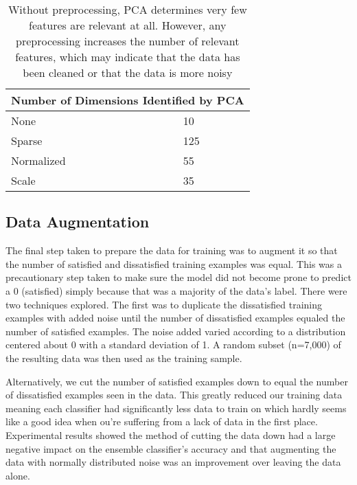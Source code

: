 \documentclass[11pt]{article}
\begin{document}
\begin{table}[h]
    \captionsetup{width=0.8\textwidth}
    \centering
    \begin{tabular}{ |p{2cm}||p{1cm}| }
    \hline
        \multicolumn{2}{|c|}{Number of Dimensions Identified by PCA} \\
    \hline
        None        & 10   \\
        Sparse      & 125  \\
        Normalized  & 55   \\
        Scale       & 35   \\
    \hline
    \end{tabular}
    \caption{Without preprocessing, PCA determines very few features are 
        relevant at all. However, any preprocessing increases the number of 
        relevant features, which may indicate that the data has been cleaned 
        or that the data is more noisy}
    \label{table:PCA}
\end{table}

\subsection{Data Augmentation} \label{data_aug}
The final step taken to prepare the data for training was to augment it so that 
the number of satisfied and dissatisfied training examples was equal. This was 
a precautionary step taken to make sure the model did not become prone to 
predict a 0 (satisfied) simply because that was a majority of the data's label. There were two techniques explored. The first was to duplicate the dissatisfied 
training examples with added noise until the number of dissatisfied examples 
equaled the number of satisfied examples. The noise added varied according to a 
distribution centered about 0 with a standard deviation of 1. A random subset 
(n=7,000) of the resulting data was then used as the training sample. 

Alternatively, we cut the number of satisfied examples down to equal the 
number of dissatisfied examples seen in the data. This greatly reduced our 
training data meaning each classifier had significantly less data to train on 
which hardly seems like a good idea when ou're suffering from a lack of data 
in the first place. Experimental results showed the method of cutting the 
data down had a large negative impact on the ensemble classifier's accuracy
and that augmenting the data with normally distributed noise was an 
improvement over leaving the data alone.
\end{document}
